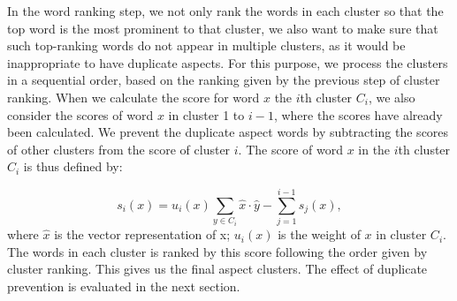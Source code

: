 In the word ranking step, we not only rank the words in each cluster so that
the top word is the most prominent to that cluster, 
we also want to make sure that such top-ranking words do not appear in
multiple clusters, as it would be inappropriate to have duplicate aspects. 
For this purpose, we process the clusters in a sequential order, 
based on the ranking given by the previous step of cluster ranking.
When we calculate the score for word $x$ the $i$th cluster $C_i$,
we also consider the scores of word $x$ in cluster 1 to $i-1$, 
where the scores have already been calculated. 
We prevent the duplicate aspect words by subtracting the scores 
of other clusters from the score of cluster $i$.
The score of word $x$ in the $i$th cluster $C_i$ is thus defined by:

\begin{equation}
s_i(x) = u_i(x) \sum_{y\in C_i}\hat{x}\cdot \hat{y} - \sum_{j=1}^{i-1}s_j(x),
\label{eq:wordscore}
\end{equation}
where $\hat{x}$ is the vector representation of x; $u_i(x)$ is the weight of $x$ in cluster $C_i$.
The words in each cluster is ranked by this score following the order given by cluster ranking.
This gives us the final aspect clusters. 
The effect of duplicate prevention is evaluated in the next section.
